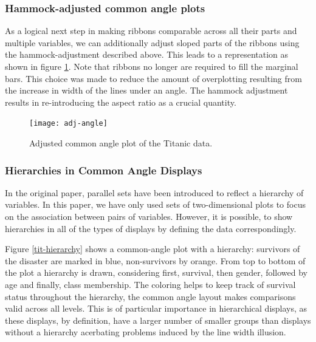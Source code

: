 \subsubsection{Hammock-adjusted common angle plots}
As a logical next step in making ribbons comparable across all their parts and multiple variables, we can additionally adjust sloped parts of the ribbons using the hammock-adjustment described above. This leads to a representation as shown in figure \ref{adj.angle}. Note that ribbons no longer are required to fill the marginal bars. This choice was made to reduce the amount of overplotting resulting from the increase in width of the lines under an angle. The hammock adjustment results in re-introducing the aspect ratio as a crucial quantity. 
\begin{figure}[hbtp]
\texttt{[image: adj-angle]}
\caption{\label{adj.angle} Adjusted common angle plot of the Titanic data.}
\end{figure}

\subsubsection{Hierarchies in Common Angle Displays}
In the original paper, parallel sets have been introduced to reflect a hierarchy of variables. In this paper, we have only used  sets of two-dimensional plots to focus on the association between pairs of variables. 
However, it is possible, to show hierarchies in all of the types of displays by defining the data correspondingly. 

Figure \ref{tit-hierarchy}
shows a common-angle plot  with a hierarchy: survivors of the disaster are marked in blue, non-survivors by orange. From top to bottom of the plot a hierarchy is drawn, considering first, survival, then gender, followed by age and finally, class membership. The coloring helps to keep track of survival status throughout the hierarchy, the common angle layout makes comparisons valid across all levels. This is of particular importance in hierarchical displays, as these displays, by definition, have a larger number of smaller groups than displays without a hierarchy acerbating problems induced by the line width illusion.

